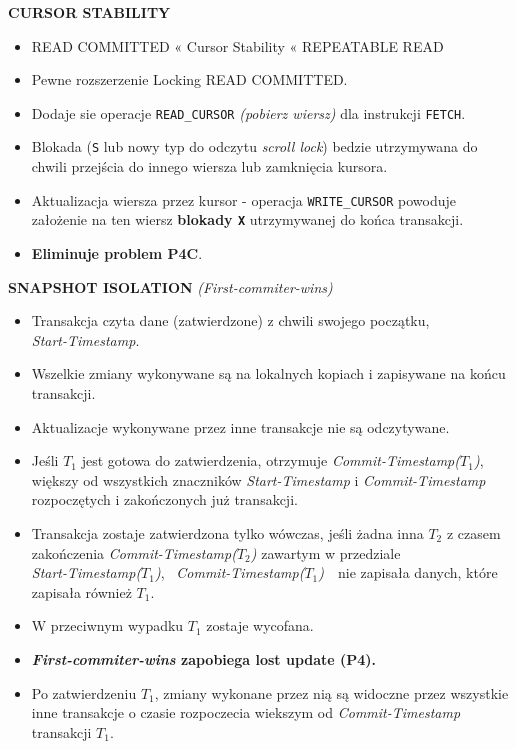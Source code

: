 \documentclass[a5paper,6pt]{article}
\begin{document}
    \textbf{CURSOR STABILITY}
    \begin{itemize}
        \item READ COMMITTED « Cursor Stability « REPEATABLE READ
        \item Pewne rozszerzenie Locking READ COMMITTED.
        \item Dodaje sie operacje \texttt{READ\_CURSOR}
              \textit{(pobierz wiersz)} dla instrukcji \texttt{FETCH}.
        \item Blokada (\texttt{S} lub nowy typ do odczytu \textit{scroll lock})
              bedzie utrzymywana do\\ chwili przejścia do innego wiersza lub
              zamknięcia kursora.
        \item Aktualizacja wiersza przez kursor - operacja
              \texttt{WRITE\_CURSOR} powoduje\\ założenie na ten wiersz
              \textbf{blokady \texttt{X}} utrzymywanej do końca transakcji.
        \item \textbf{Eliminuje problem P4C}.
    \end{itemize}

    \textbf{SNAPSHOT ISOLATION} \textit{(First-commiter-wins)}
    \begin{itemize}
        \item Transakcja czyta dane (zatwierdzone) z chwili swojego początku,\\
              \textit{Start-Timestamp}.
        \item Wszelkie zmiany wykonywane są na lokalnych kopiach i zapisywane
              na końcu transakcji.
        \item Aktualizacje wykonywane przez inne transakcje nie są odczytywane.
        \item Jeśli $T_1$ jest gotowa do zatwierdzenia, otrzymuje
              \textit{Commit-Timestamp($T_1$)}, większy od wszystkich znaczników
              \textit{Start-Timestamp} i \textit{Commit-Timestamp}\\
              rozpoczętych i zakończonych już transakcji.
        \item Transakcja zostaje zatwierdzona tylko wówczas, jeśli żadna inna
              $T_2$
              z czasem zakończenia \textit{Commit-Timestamp($T_2$)} zawartym w
              przedziale\\
              \lbrack\textit{Start-Timestamp($T_1$)},~
              \textit{Commit-Timestamp($T_1$)}\rbrack~~nie zapisała danych,
              które zapisała również $T_1$.
        \item W przeciwnym wypadku $T_1$ zostaje wycofana.
        \item \textbf{\textit{First-commiter-wins} zapobiega lost update (P4).}
        \item Po zatwierdzeniu $T_1$, zmiany wykonane przez nią są widoczne
              przez wszystkie inne transakcje o czasie rozpoczecia wiekszym od
              \textit{Commit-Timestamp} transakcji $T_1$.
    \end{itemize}
\end{document}
